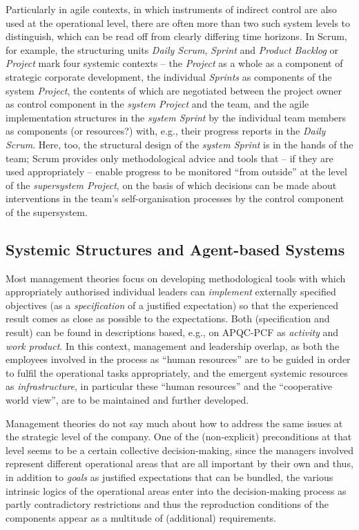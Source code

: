 \documentclass[11pt,a4paper]{article}
\begin{document}
Particularly in agile contexts, in which instruments of indirect control are
also used at the operational level, there are often more than two such system
levels to distinguish, which can be read off from clearly differing time
horizons.  In Scrum, for example, the structuring units \emph{Daily Scrum},
\emph{Sprint} and \emph{Product Backlog} or \emph{Project} mark four systemic
contexts -- the \emph{Project} as a whole as a component of strategic
corporate development, the individual \emph{Sprints} as components of the
system \emph{Project}, the contents of which are negotiated between the
project owner as control component in the \emph{system Project} and the team,
and the agile implementation structures in the \emph{system Sprint} by the
individual team members as components (or resources?) with, e.g., their
progress reports in the \emph{Daily Scrum}. Here, too, the structural design
of the \emph{system Sprint} is in the hands of the team; Scrum provides only
methodological advice and tools that -- if they are used appropriately --
enable progress to be monitored \enquote{from outside} at the level of the
\emph{supersystem Project}, on the basis of which decisions can be made about
interventions in the team's self-organisation processes by the control
component of the supersystem.

\subsection{Systemic Structures and Agent-based Systems}

Most management theories focus on developing methodological tools with which
appropriately authorised individual leaders can \emph{implement} externally
specified objectives (as a \emph{specification} of a justified expectation) so
that the experienced result comes as close as possible to the expectations.
Both (specification and result) can be found in descriptions based, e.g., on
APQC-PCF as \emph{activity} and \emph{work product}. In this context,
management and leadership overlap, as both the employees involved in the
process as \enquote{human resources} are to be guided in order to fulfil the
operational tasks appropriately, and the emergent systemic resources as
\emph{infrastructure}, in particular these \enquote{human resources} and the
\enquote{cooperative world view}, are to be maintained and further developed.

Management theories do not say much about how to address the same issues at the
strategic level of the company. One of the (non-explicit) preconditions at
that level seems to be a certain collective decision-making, since the
managers involved represent different operational areas that are all important
by their own and thus, in addition to \emph{goals} as justified expectations
that can be bundled, the various intrinsic logics of the operational areas
enter into the decision-making process as partly contradictory restrictions
and thus the reproduction conditions of the components appear as a multitude
of (additional) requirements.
\end{document}
